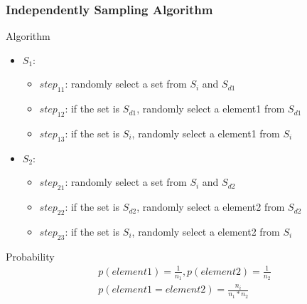 \documentclass[notheorems, aspectratio=54]{beamer}
\begin{document}
\begin{frame}
    \frametitle{Independently Sampling Algorithm}
    \begin{block}{Algorithm}
        \begin{itemize}
            \item $S_1$:
            \begin{itemize}
                \item $step_{11}$: randomly select a set from $S_i$ and $S_{d1}$
                \item $step_{12}$: if the set is $S_{d1}$, randomly select a element1 from $S_{d1}$
                \item $step_{13}$: if the set is $S_i$, randomly select a element1 from $S_i$
            \end{itemize}
            \item $S_2$:
            \begin{itemize}
                \item $step_{21}$: randomly select a set from $S_i$ and $S_{d2}$
                \item $step_{22}$: if the set is $S_{d2}$, randomly select a element2 from $S_{d2}$
                \item $step_{23}$: if the set is $S_i$, randomly select a element2 from $S_i$
            \end{itemize}
        \end{itemize}
    \end{block}
    \begin{block}{Probability}
        \begin{equation}
            \begin{aligned}
                p(element1) = \frac{1}{n_1},p(element2) = \frac{1}{n_2}\\
                p(element1 = element2) = \frac{n_i}{n_1*n_2}
            \end{aligned}
        \end{equation}
    \end{block}
\end{frame}
\end{document}
